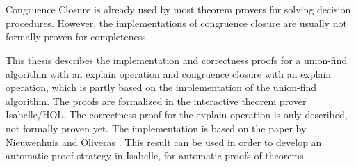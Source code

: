 \chapter{\abstractname}


Congruence Closure is already used by most theorem provers for solving decision procedures.  However, the implementations of congruence closure are usually not formally proven for completeness.

This thesis describes the implementation and correctness proofs for a union-find algorithm with an explain operation and congruence closure with an explain operation, which is partly based on the implementation of the union-find algorithm. The proofs are formalized in the interactive theorem prover Isabelle/HOL. The correctness proof for the explain operation is only described, not formally proven yet. The implementation is based on the paper by Nieuwenhuis and Oliveras \cite{Nieuwenhuis}. This result can be used in order to develop an automatic proof strategy in Isabelle, for automatic proofs of theorems.